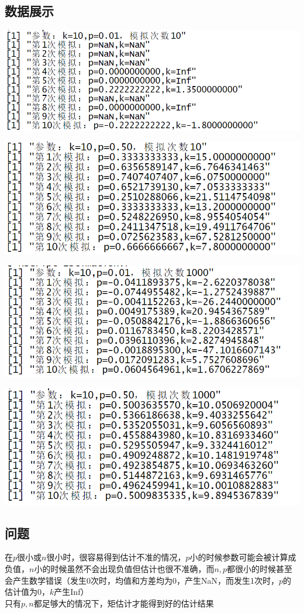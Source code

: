 \documentclass{article}
\begin{document}
\begin{CJK}{UTF8}{gbsn}
\subsection{数据展示}
\begin{minipage}{0.5\textwidth}
    \includegraphics[scale=0.6]{experi1.png}
\end{minipage}
\begin{minipage}{0.5\textwidth}
    \includegraphics[scale=0.6]{experi2.png}
\end{minipage}
\begin{minipage}{0.5\textwidth}
    \includegraphics[scale=0.6]{experi3.png}
\end{minipage}
\begin{minipage}{0.5\textwidth}
    \includegraphics[scale=0.6]{experi4.png}
\end{minipage}
\subsection{问题}
在$p$很小或$n$很小时，很容易得到估计不准的情况，$p$小的时候参数可能会被计算成负值，$n$小的时候虽然不会出现负值但估计也很不准确，而$n,p$都很小的时候甚至会产生数学错误（发生0次时，均值和方差均为0，产生NaN，而发生1次时，$p$的估计值为0，$k$产生Inf）
\\只有$p,n$都足够大的情况下，矩估计才能得到好的估计结果
\end{CJK}
\end{document}
